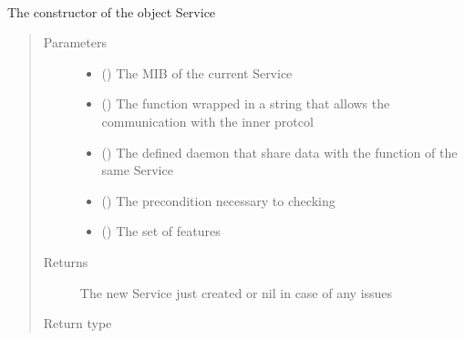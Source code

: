 \documentclass[a4paper,10pt,english,openany,oneside]{sphinxmanual}
\begin{document}
\begin{fulllineitems}
\label{\detokenize{code:Service}}~

\begin{fulllineitems}
\label{\detokenize{code:Service.new}}
The constructor of the object Service
\begin{quote}\begin{description}
\item[{Parameters}] \leavevmode\begin{itemize}
\item {} 
 () \textendash{} The MIB of the current Service

\item {} 
 () \textendash{} The function wrapped in a string that allows the communication with the inner protcol

\item {} 
 () \textendash{} The defined daemon that share data with the function of the same Service

\item {} 
 () \textendash{} The pre\sphinxhyphen{}condition necessary to checking

\item {} 
 () \textendash{} The set of features

\end{itemize}

\item[{Returns}] \leavevmode
The new Service just created or nil in case of any issues

\item[{Return type}] \leavevmode
{\hyperref[\detokenize{code:Service}]{}}

\end{description}\end{quote}

\end{fulllineitems}


\end{fulllineitems}
\end{document}
